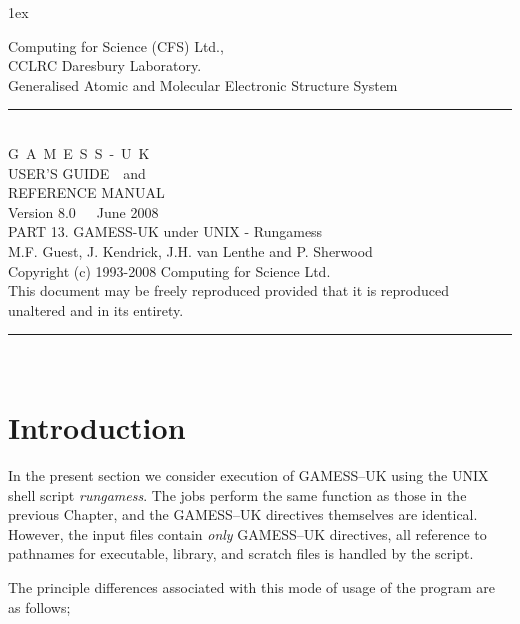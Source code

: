 \documentclass[11pt,fleqn]{article}
\begin{document}
\sf
\parindent 0cm
\parskip 1ex
\begin{flushleft}
 
Computing for Science (CFS) Ltd.,\\CCLRC Daresbury Laboratory.\\[0.30in]
{\large Generalised Atomic and Molecular Electronic Structure System }\\[.2in]
\rule{150mm}{3mm}\\
\vspace{.2in}
{\huge G~A~M~E~S~S~-~U~K}\\[.3in]
{\huge USER'S GUIDE~~and}\\[.2in]
{\huge REFERENCE MANUAL}\\[0.2in]
{\huge Version 8.0~~~June 2008}\\ [.2in]
{\large PART 13. GAMESS-UK under UNIX - Rungamess }\\
\vspace{.1in}
{\large M.F. Guest, J. Kendrick, J.H. van Lenthe and P. Sherwood}\\[0.2in]
 
Copyright (c) 1993-2008 Computing for Science Ltd.\\[.1in]
This document may be freely reproduced provided that it is reproduced\\
unaltered and in its entirety.\\
\vspace{.2in}
\rule{150mm}{3mm}\\
\end{flushleft}

\tableofcontents


\newpage
% 

\section[Introduction]{Introduction}

In the present section we consider execution of GAMESS--UK
using the UNIX shell script {\em rungamess}. The jobs perform the same function as those 
in the previous Chapter, and the GAMESS--UK directives themselves are identical.
However, the input files contain {\em only} GAMESS--UK directives, all reference to
pathnames for executable, library, and scratch files is handled
by the script.

The principle differences associated with this mode of usage of
the program are as follows;
\end{document}
